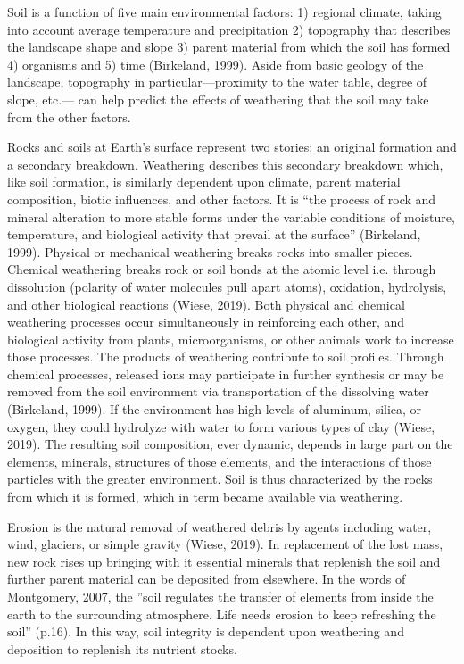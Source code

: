 \documentclass{book}\usepackage{knitr}
\begin{document}
Soil is a function of five main environmental factors: 1) regional climate, taking into account average temperature and precipitation 2) topography that describes the landscape shape and slope 3) parent material from which the soil has formed 4) organisms and 5) time (Birkeland, 1999). Aside from basic geology of the landscape, topography in particular—proximity to the water table, degree of slope, etc.— can help predict the effects of weathering that the soil may take from the other factors.

Rocks and soils at Earth’s surface represent two stories: an original formation and a secondary breakdown. Weathering describes this secondary breakdown which, like soil formation, is similarly dependent upon climate, parent material composition, biotic influences, and other factors. It is “the process of rock and mineral alteration to more stable forms under the variable conditions of moisture, temperature, and biological activity that prevail at the surface” (Birkeland, 1999). Physical or mechanical weathering breaks rocks into smaller pieces. Chemical weathering breaks rock or soil bonds at the atomic level i.e. through dissolution (polarity of water molecules pull apart atoms), oxidation, hydrolysis, and other biological reactions (Wiese, 2019). Both physical and chemical weathering processes occur simultaneously in reinforcing each other, and biological activity from plants, microorganisms, or other animals work to increase those processes. The products of weathering contribute to soil profiles. Through chemical processes, released ions may participate in further synthesis or may be removed from the soil environment via transportation of the dissolving water (Birkeland, 1999). If the environment has high levels of aluminum, silica, or oxygen, they could hydrolyze with water to form various types of clay (Wiese, 2019). The resulting soil composition, ever dynamic, depends in large part on the elements, minerals, structures of those elements, and the interactions of those particles with the greater environment. Soil is thus characterized by the rocks from which it is formed, which in term became available via weathering.

Erosion is the natural removal of weathered debris by agents including water, wind, glaciers, or simple gravity (Wiese, 2019). In replacement of the lost mass, new rock rises up bringing with it essential minerals that replenish the soil and further parent material can be deposited from elsewhere. In the words of Montgomery, 2007, the ''soil regulates the transfer of elements from inside the earth to the surrounding atmosphere. Life needs erosion to keep refreshing the soil'' (p.16). In this way, soil integrity is dependent upon weathering and deposition to replenish its nutrient stocks.
\end{document}
